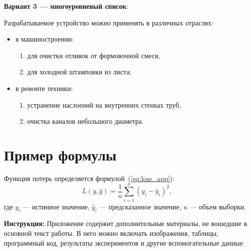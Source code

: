 \textbf{Вариант 3 --- многоуровневый список}:

Разрабатываемое устройство можно применять в различных отраслях:
\begin{itemize}
  \item в машиностроении:
  \begin{enumerate}
    \item для очистки отливок от формовочной смеси,
    \item для холодной штамповки из листа;
  \end{enumerate}
  \item в ремонте техники:
  \begin{enumerate}
    \item устранение наслоений на внутренних стенках труб,
    \item очистка каналов небольшого диаметра.
  \end{enumerate}
\end{itemize}

\section*{Пример формулы}

Функция потерь определяется формулой~(\ref{eq:loss_app}):
\begin{equation}
L(y, \hat{y}) = \frac{1}{n} \sum_{i=1}^{n} (y_i - \hat{y}_i)^2,
\label{eq:loss_app}
\end{equation}
где $y_i$ --- истинное значение, $\hat{y}_i$ --- предсказанное значение, $n$ --- объем выборки.

\bigskip
\textbf{Инструкция:} Приложение содержит дополнительные материалы, не вошедшие в основной текст работы. В него можно включать изображения, таблицы, программный код, результаты экспериментов и другие вспомогательные данные.
